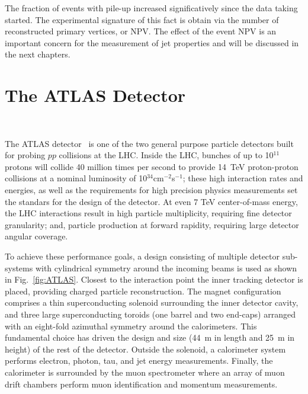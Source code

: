 The fraction of events with pile-up increased significatively since the data taking started. The experimental signature of this fact is obtain via the number of reconstructed primary vertices, or NPV. The effect of the event NPV is an important concern for the measurement of jet properties and will be discussed in the next chapters.


%
%
\section{The ATLAS Detector}~\label{sec:ATLASDetector}


The ATLAS detector~\cite{ATLAS} is one of the two general purpose particle detectors built for probing $pp$ collisions at the LHC. %
Inside the LHC, bunches of up to 10$^{11}$ protons will collide 40 million times per second to provide 14~TeV proton-proton collisions at a nominal luminosity of 10$^{34}$cm$^{-2}$s$^{-1}$; these high interaction rates and energies, as well as the requirements for high precision physics measurements set the standars for the design of the detector. At even 7 TeV center-of-mass energy, the LHC interactions result in high particle multiplicity, requiring fine detector granularity; and, particle production at forward rapidity, requiring large detector angular coverage.

To achieve these performance goals, a design consisting of multiple detector sub-systems with cylindrical symmetry around the incoming beams is used as shown in Fig.~\ref{fig:ATLAS}. Closest to the interaction point the inner tracking detector is placed, providing charged particle reconstruction. The magnet configuration comprises a thin superconducting solenoid surrounding the inner detector cavity, and three large superconducting toroids (one barrel and two end-caps) arranged with an eight-fold azimuthal symmetry around the calorimeters. This fundamental choice has driven the design and size (44~m in length and 25~m in height) of the rest of the detector. Outside the solenoid, a calorimeter system performs electron, photon, tau, and jet energy measurements. %
Finally, the calorimeter is surrounded by the muon spectrometer where an array of muon drift chambers perform muon identification and momentum measurements.

